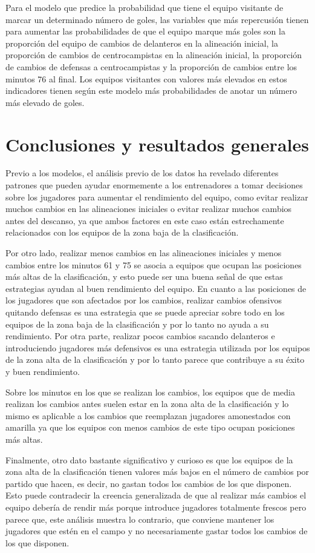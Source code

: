 Para el modelo que predice la probabilidad que tiene el equipo visitante de marcar un determinado
número de goles, las variables que más repercusión tienen para aumentar las probabilidades de 
que el equipo marque más goles son la proporción del equipo de cambios de delanteros en la 
alineación inicial, la proporción de cambios de centrocampistas en la alineación inicial, la 
proporción de cambios de defensas a centrocampistas y la proporción de cambios entre los 
minutos 76 al final. Los equipos visitantes con valores más elevados en estos indicadores tienen 
según este modelo más probabilidades de anotar un número más elevado de goles.

\section{Conclusiones y resultados generales}


Previo a los modelos, el análisis previo de los datos ha revelado diferentes patrones que pueden 
ayudar enormemente a los entrenadores a tomar decisiones sobre los jugadores para aumentar el 
rendimiento del equipo, como evitar realizar muchos cambios en las alineaciones iniciales o evitar 
realizar muchos cambios antes del descanso, ya que ambos factores en este caso están 
estrechamente relacionados con los equipos de la zona baja de la clasificación. 

Por otro lado, realizar menos cambios en las alineaciones iniciales y menos cambios entre los 
minutos 61 y 75 se asocia a equipos que ocupan las posiciones más altas de la clasificación, y esto 
puede ser una buena señal de que estas estrategias ayudan al buen rendimiento del equipo.
En cuanto a las posiciones de los jugadores que son afectados por los cambios, realizar cambios 
ofensivos quitando defensas es una estrategia que se puede apreciar sobre todo en los equipos de 
la zona baja de la clasificación y por lo tanto no ayuda a su rendimiento. Por otra parte, realizar 
pocos cambios sacando delanteros e introduciendo jugadores más defensivos es una estrategia 
utilizada por los equipos de la zona alta de la clasificación y por lo tanto parece que contribuye a 
su éxito y buen rendimiento.

Sobre los minutos en los que se realizan los cambios, los equipos que de media realizan los 
cambios antes suelen estar en la zona alta de la clasificación y lo mismo es aplicable a los cambios 
que reemplazan jugadores amonestados con amarilla ya que los equipos con menos cambios de 
este tipo ocupan posiciones más altas.

Finalmente, otro dato bastante significativo y curioso es que los equipos de la zona alta de la 
clasificación tienen valores más bajos en el número de cambios por partido que hacen, es decir, 
no gastan todos los cambios de los que disponen. Esto puede contradecir la creencia generalizada 
de que al realizar más cambios el equipo debería de rendir más porque introduce jugadores 
totalmente frescos pero parece que, este análisis muestra lo contrario, que conviene mantener los 
jugadores que estén en el campo y no necesariamente gastar todos los cambios de los que 
disponen.

